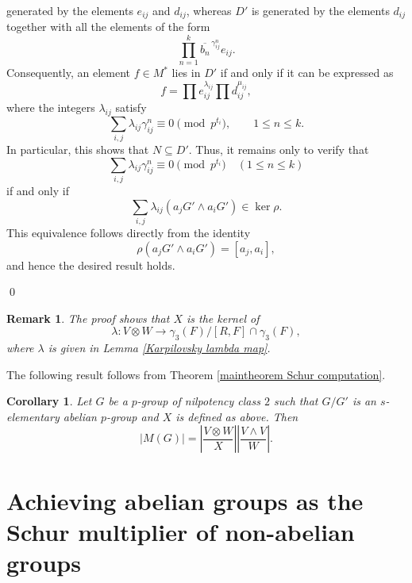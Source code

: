 \documentclass[preprint,sort&compress,12pt]{elsarticle}
\newtheorem{corollary}[theorem]{Corollary}
\newtheorem{remark}[theorem]{Remark}
\numberwithin{equation}{section}
\theoremstyle{definition}
\begin{document}
\begin{enumerate}
generated by the elements $e_{ij}$ and $d_{ij}$, whereas $D'$ is generated
by the elements $d_{ij}$ together with all the elements of the form
\[
\prod_{n=1}^{k} \overline{b_n}^{\,\gamma_{ij}^{n}} e_{ij}.
\]
Consequently, an element $f \in M^{*}$ lies in $D'$ if and only if it can be
expressed as
\[
f = \prod e_{ij}^{\lambda_{ij}} \prod d_{ij}^{\mu_{ij}},
\]
where the integers $\lambda_{ij}$ satisfy
\[
\sum_{i,j} \lambda_{ij}\gamma_{ij}^{n} \equiv 0 \pmod{p^{t_i}},
\qquad 1 \le n \le k.
\]
In particular, this shows that $N \subseteq D'$. Thus, it remains only to
verify that
\[
\sum_{i,j} \lambda_{ij}\gamma_{ij}^{n} \equiv 0 \pmod{p^{t_i}}
\quad (1 \le n \le k)
\]
if and only if
\[
\sum_{i,j} \lambda_{ij}(a_jG' \wedge a_iG') \in \ker \rho.
\]
This equivalence follows directly from the identity
\[
\rho(a_jG' \wedge a_iG') = [a_j,a_i],
\]
and hence the desired result holds.
\end{enumerate}
\qed
\begin{remark}\label{kernel=X}
    The proof shows that $X$ is the kernel of $$\lambda : V \otimes W \to \gamma_3(F)/[R,F] \cap \gamma_3(F),$$ where $\lambda$ is given in Lemma \ref{Karpilovsky lambda map}.
\end{remark}The following result follows from Theorem \ref{maintheorem Schur computation}.

\begin{corollary}\label{Schurmultiplier_final}
        Let $G$ be a $p$-group of nilpotency class $2$ such that $G/G'$ is an $s$-elementary abelian $p$-group and $X$ is defined as above. Then $$|M(G)|=|\frac{V \otimes W}{X}| |\frac{V\wedge V}{W}|.$$
\end{corollary}



\section{%
Achieving abelian groups as the Schur multiplier of non-abelian groups}
\label{Kourovka}  
\end{document}
